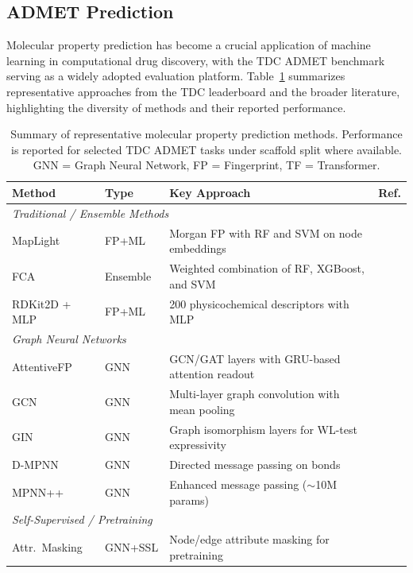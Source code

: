 \documentclass[12pt]{article}
\begin{document}
\subsection{ADMET Prediction}

Molecular property prediction has become a crucial application of machine learning in computational drug discovery, with the TDC ADMET benchmark~\cite{huang2021therapeuticsdatacommonsmachine} serving as a widely adopted evaluation platform. Table~\ref{tab:related_work_summary} summarizes representative approaches from the TDC leaderboard and the broader literature, highlighting the diversity of methods and their reported performance.

\begin{table}[htbp]
\centering
\caption{Summary of representative molecular property prediction methods. Performance is reported for selected TDC ADMET tasks under scaffold split where available. GNN = Graph Neural Network, FP = Fingerprint, TF = Transformer.}
\label{tab:related_work_summary}
\scriptsize
\begin{tabular}{llp{4.2cm}l}
\toprule
\textbf{Method} & \textbf{Type} & \textbf{Key Approach} & \textbf{Ref.} \\
\midrule
\multicolumn{4}{l}{\emph{Traditional / Ensemble Methods}} \\
\midrule
MapLight & FP+ML & Morgan FP with RF and SVM on node embeddings & \cite{maplight} \\
FCA & Ensemble & Weighted combination of RF, XGBoost, and SVM & \cite{cfa} \\
RDKit2D + MLP & FP+ML & 200 physicochemical descriptors with MLP & \cite{rdkit2d_mlp} \\
\midrule
\multicolumn{4}{l}{\emph{Graph Neural Networks}} \\
\midrule
AttentiveFP & GNN & GCN/GAT layers with GRU-based attention readout & \cite{attentiveFP} \\
GCN & GNN & Multi-layer graph convolution with mean pooling & \cite{kipf2017gcn} \\
GIN & GNN & Graph isomorphism layers for WL-test expressivity & \cite{xu2019gin} \\
D-MPNN & GNN & Directed message passing on bonds & \cite{yang2019dmpnn} \\
MPNN++ & GNN & Enhanced message passing ($\sim$10M params) & \cite{miniMol} \\
\midrule
\multicolumn{4}{l}{\emph{Self-Supervised / Pretraining}} \\
\midrule
Attr.\ Masking & GNN+SSL & Node/edge attribute masking for pretraining & \cite{attrMasking} \\

\end{tabular}
\end{table}
\end{document}
